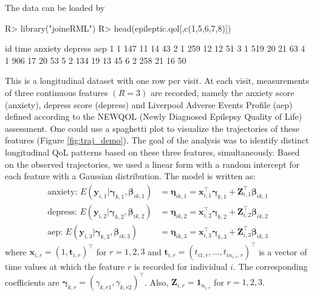 The data can be loaded by

\begin{example}
R> library("joineRML")
R> head(epileptic.qol[,c(1,5,6,7,8)])
\end{example}

\begin{example}
  id time anxiety depress aep
1  1  147      11      14  43
2  1  259      12      12  51
3  1  519      20      21  63
4  1  906      17      20  53
5  2  134      19      13  45
6  2  258      21      16  50
\end{example}

This is a longitudinal dataset with one row per visit. At each visit, measurements of three continuous features $(R = 3)$ are recorded, namely the anxiety score (anxiety), depress score (depress) and Liverpool Adverse Events Profile (aep) defined according to the NEWQOL (Newly Diagnosed Epilepsy Quality of Life) assessment. One could use a spaghetti plot to visualize the trajectories of these features (Figure \ref{fig:traj_demo}). The goal of the analysis was to identify distinct longitudinal QoL patterns based on these three features, simultaneously. Based on the observed trajectories, we used a linear form with a random intercept for each feature with a Gaussian distribution. The model is written as: 
\begin{align*}
  \text{anxiety: }  E(\boldsymbol{y}_{i,1}|\boldsymbol{\gamma}_{k,1}, \boldsymbol{\beta}_{ik,1}) & = \boldsymbol{\eta}_{ik,1}  =   \boldsymbol{x}_{i,1}^\top\boldsymbol{\gamma}_{k,1} +  \boldsymbol{Z}_{i,1}^\top\boldsymbol{\beta}_{ik,1}  \\
  \text{depress: }    E(\boldsymbol{y}_{i,2}|\boldsymbol{\gamma}_{k,2}, \boldsymbol{\beta}_{ik,2}) & = \boldsymbol{\eta}_{ik,2}  =  \boldsymbol{x}_{i,2}^\top\boldsymbol{\gamma}_{k,2} +  \boldsymbol{Z}_{i,2}^\top\boldsymbol{\beta}_{ik,2} \\
  \text{aep: }   E(\boldsymbol{y}_{i,3}|\boldsymbol{\gamma}_{k,3},\boldsymbol{\beta}_{ik,3}) & =  \boldsymbol{\eta}_{ik,3} = \boldsymbol{x}_{i,3}^\top\boldsymbol{\gamma}_{k,3} +  \boldsymbol{Z}_{i,3}^\top\boldsymbol{\beta}_{ik,3}
\end{align*}
where $ \boldsymbol{x}_{i,r} = (1,  \boldsymbol{t}_{i,r})^\top$ for $r=1,2,3$ and $\boldsymbol{t}_{i,r} = (t_{i1,r},...,t_{in_{i,r},r})^\top$ is a vector of time values at which the feature $r$ is recorded for individual $i$. The corresponding coefficients are $\boldsymbol{\gamma}_{k,r} =  (\gamma_{k,r1}, \gamma_{k,r2})^\top$. Also, $\boldsymbol{Z}_{i,r} =\boldsymbol{1}_{n_{i,r}}$ for $r=1,2,3$.

